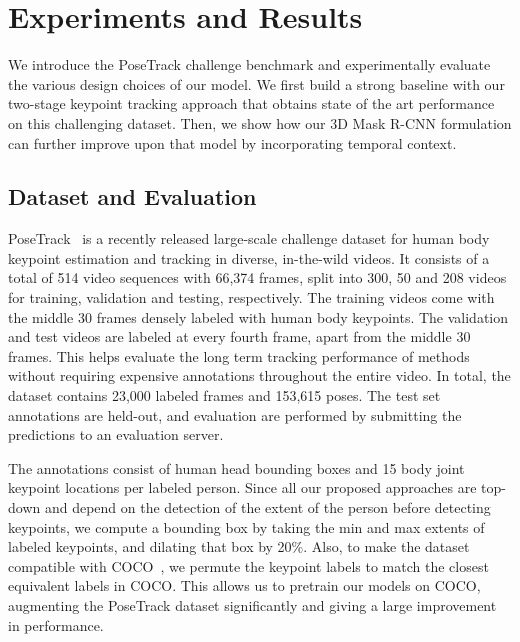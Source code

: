 \documentclass[10pt,twocolumn,letterpaper]{article}
\newcommand{\MODEL}[0]{3D Mask R-CNN}
\begin{document}
\section{Experiments and Results}
\label{sec:exp}


We introduce the PoseTrack challenge benchmark and
experimentally evaluate the various design choices of our model.
We first build a strong baseline with our two-stage keypoint tracking approach that obtains
state of the art performance on this challenging dataset. Then, we show how our \MODEL{}
formulation can further improve upon that model by incorporating temporal context.




\subsection{Dataset and Evaluation}\label{sec:exp:dataset}

PoseTrack~\cite{posetrack_data,PoseTrack} is a recently released 
large-scale challenge dataset for human body
keypoint estimation and tracking in diverse, in-the-wild videos. 
It consists of a total of 514 video sequences with 66,374 frames, split
into 300, 50 and 208 videos for training, validation and testing, respectively.
The training videos come with the middle 30 frames densely 
labeled with human body keypoints. The validation and test
videos are labeled at every fourth frame, apart from the middle 30
frames. This helps evaluate the long term tracking performance 
of methods without requiring expensive annotations throughout the entire
video. In total, the dataset contains 23,000 
labeled frames and 153,615 poses.
The test set annotations are held-out, and evaluation are performed
by submitting the predictions to an evaluation server.

The annotations consist of  human head bounding boxes and
15 body joint keypoint locations per labeled person. 
Since all our proposed approaches are top-down and depend on the
detection of the extent of the person before detecting keypoints,
we compute a bounding box by taking the min 
and max extents of labeled keypoints, and dilating that box by 20\%.
Also, to make the dataset compatible with COCO~\cite{coco_dataset,lin2014microsoft},
we permute the keypoint labels 
to match the closest equivalent labels in COCO.
This allows us to pretrain our models on COCO, augmenting the PoseTrack dataset significantly and giving a large improvement in performance.
\end{document}
